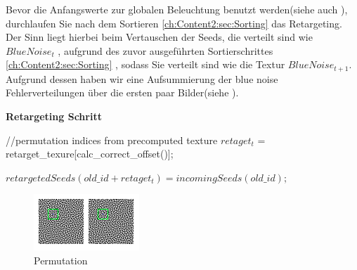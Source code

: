 Bevor die Anfangswerte zur globalen Beleuchtung benutzt werden(siehe auch ), durchlaufen Sie nach dem Sortieren \ref{ch:Content2:sec:Sorting}
das Retargeting. Der Sinn liegt hierbei beim Vertauschen der Seeds, die 
verteilt sind wie $BlueNoise_{t}$ , aufgrund des zuvor ausgeführten Sortierschrittes \ref{ch:Content2:sec:Sorting}
, sodass Sie verteilt sind wie die Textur
$BlueNoise_{t+1}$. Aufgrund dessen haben wir eine Aufsummierung der
blue noise Fehlerverteilungen über die ersten paar Bilder(siehe ).

\begin{algorithm}[H]
    \caption{\textbf{Retargeting Schritt}}
    \begin{algorithmic}[1]
        \State //permutation indices from precomputed texture
        \State $retaget_{t}$ = retarget\_texure[calc\_correct\_offset()];
        
        \State $retargetedSeeds(old\_id + retaget_{t}) = incomingSeeds(old\_id);$
        
    \end{algorithmic}
    \label{alg:retargetingAlg}
\end{algorithm}

\begin{figure}[H]\label{pic:Permutation}
    \centering
    \includegraphics[width=0.5\linewidth]{content/simulatedAnnealing/Bilder/Permutation.png}
    \caption{Permutation}
\end{figure}

